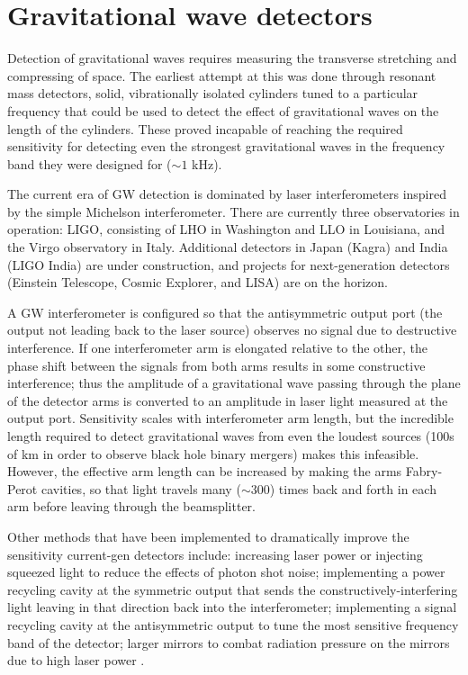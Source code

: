 \chapter{Gravitational wave detectors}

Detection of gravitational waves requires measuring the transverse stretching and compressing of space. The earliest attempt at this was done through resonant mass detectors, solid, vibrationally isolated cylinders tuned to a particular frequency that could be used to detect the effect of gravitational waves on the length of the cylinders. These proved incapable of reaching the required sensitivity for detecting even the strongest gravitational waves in the frequency band they were designed for ($\sim1$ kHz).

The current era of \ac{GW} detection is dominated by laser interferometers inspired by the simple Michelson interferometer. There are currently three observatories in operation: \ac{LIGO}, consisting of \ac{LHO} in Washington and \ac{LLO} in Louisiana, and the Virgo observatory in Italy. Additional detectors in Japan (Kagra) and India (\ac{LIGO} India) are under construction, and projects for next-generation detectors (Einstein Telescope, Cosmic Explorer, and \ac{LISA}) are on the horizon.

A \ac{GW} interferometer is configured so that the antisymmetric output port (the output not leading back to the laser source) observes no signal due to destructive interference. If one interferometer arm is elongated relative to the other, the phase shift between the signals from both arms results in some constructive interference; thus the amplitude of a gravitational wave passing through the plane of the detector arms is converted to an amplitude in laser light measured at the output port. Sensitivity scales with interferometer arm length, but the incredible length required to detect gravitational waves from even the loudest sources (100s of km in order to observe black hole binary mergers) makes this infeasible. However, the effective arm length can be increased by making the arms Fabry-Perot cavities, so that light travels many ($\sim300$) times back and forth in each arm before leaving through the beamsplitter.

Other methods that have been implemented to dramatically improve the sensitivity current-gen detectors include: increasing laser power or injecting squeezed light to reduce the effects of photon shot noise; implementing a power recycling cavity at the symmetric output that sends the constructively-interfering light leaving in that direction back into the interferometer; implementing a signal recycling cavity at the antisymmetric output to tune the most sensitive frequency band of the detector; larger mirrors to combat radiation pressure on the mirrors due to high laser power \cite{creightonanderson}.

